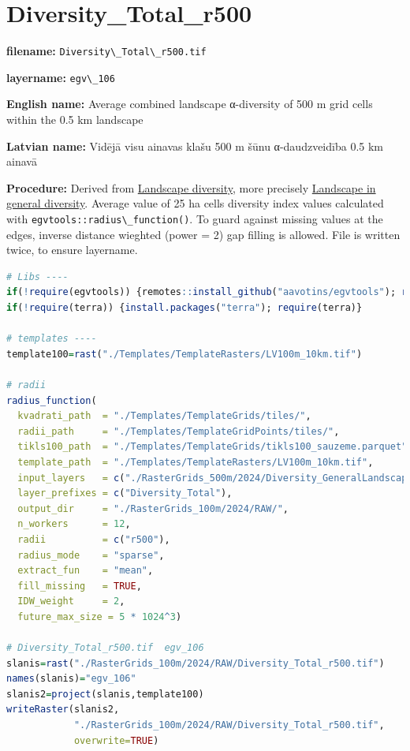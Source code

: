 \documentclass[
]{book}
\newcommand{\passthrough}[1]{#1}
\begin{document}
\section{Diversity\_Total\_r500}\label{ch06.106}

\textbf{filename:} \passthrough{\lstinline!Diversity\_Total\_r500.tif!}

\textbf{layername:} \passthrough{\lstinline!egv\_106!}

\textbf{English name:} Average combined landscape α-diversity of 500 m grid cells within the 0.5 km landscape

\textbf{Latvian name:} Vidējā visu ainavas klašu 500 m šūnu α-daudzveidība 0.5 km ainavā

\textbf{Procedure:} Derived from \hyperref[Ch05.04]{Landscape diversity}, more precisely
\hyperref[Ch05.04.01]{Landscape in general diversity}. Average value of 25 ha
cells diversity index values calculated with \passthrough{\lstinline!egvtools::radius\_function()!}. To
guard against missing values at the edges, inverse distance wieghted (power = 2)
gap filling is allowed. File is written twice, to ensure layername.

\begin{lstlisting}[language=R]
# Libs ----
if(!require(egvtools)) {remotes::install_github("aavotins/egvtools"); require(egvtools)}
if(!require(terra)) {install.packages("terra"); require(terra)}

# templates ----
template100=rast("./Templates/TemplateRasters/LV100m_10km.tif")

# radii
radius_function(
  kvadrati_path  = "./Templates/TemplateGrids/tiles/",
  radii_path     = "./Templates/TemplateGridPoints/tiles/",
  tikls100_path  = "./Templates/TemplateGrids/tikls100_sauzeme.parquet",
  template_path  = "./Templates/TemplateRasters/LV100m_10km.tif",
  input_layers   = c("./RasterGrids_500m/2024/Diversity_GeneralLandscape_500x.tif"),
  layer_prefixes = c("Diversity_Total"),
  output_dir     = "./RasterGrids_100m/2024/RAW/",
  n_workers      = 12,
  radii          = c("r500"),
  radius_mode    = "sparse",
  extract_fun    = "mean",
  fill_missing   = TRUE,
  IDW_weight     = 2,
  future_max_size = 5 * 1024^3)

# Diversity_Total_r500.tif  egv_106
slanis=rast("./RasterGrids_100m/2024/RAW/Diversity_Total_r500.tif")
names(slanis)="egv_106"
slanis2=project(slanis,template100)
writeRaster(slanis2,
            "./RasterGrids_100m/2024/RAW/Diversity_Total_r500.tif",
            overwrite=TRUE)
\end{lstlisting}
\end{document}
